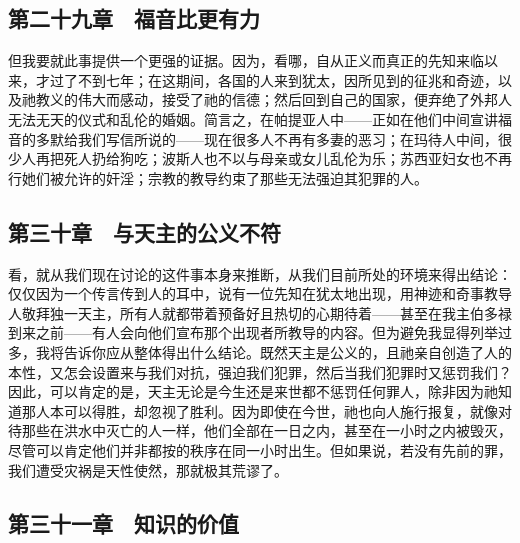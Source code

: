 
\subsection{第二十九章　福音比更有力}

但我要就此事提供一个更强的证据。因为，看哪，自从正义而真正的先知来临以来，才过了不到七年；在这期间，各国的人来到犹太，因所见到的征兆和奇迹，以及祂教义的伟大而感动，接受了祂的信德；然后回到自己的国家，便弃绝了外邦人无法无天的仪式和乱伦的婚姻。简言之，在帕提亚人中——正如在他们中间宣讲福音的多默给我们写信所说的——现在很多人不再有多妻的恶习；在玛待人中间，很少人再把死人扔给狗吃；波斯人也不以与母亲或女儿乱伦为乐；苏西亚妇女也不再行她们被允许的奸淫；宗教的教导约束了那些无法强迫其犯罪的人。\par


\subsection{第三十章　与天主的公义不符}

看，就从我们现在讨论的这件事本身来推断，从我们目前所处的环境来得出结论：仅仅因为一个传言传到人的耳中，说有一位先知在犹太地出现，用神迹和奇事教导人敬拜独一天主，所有人就都带着预备好且热切的心期待着——甚至在我主伯多禄到来之前——有人会向他们宣布那个出现者所教导的内容。但为避免我显得列举过多，我将告诉你应从整体得出什么结论。既然天主是公义的，且祂亲自创造了人的本性，又怎会设置来与我们对抗，强迫我们犯罪，然后当我们犯罪时又惩罚我们？因此，可以肯定的是，天主无论是今生还是来世都不惩罚任何罪人，除非因为祂知道那人本可以得胜，却忽视了胜利。因为即使在今世，祂也向人施行报复，就像对待那些在洪水中灭亡的人一样，他们全部在一日之内，甚至在一小时之内被毁灭，尽管可以肯定他们并非都按的秩序在同一小时出生。但如果说，若没有先前的罪，我们遭受灾祸是天性使然，那就极其荒谬了。\par


\subsection{第三十一章　知识的价值}

